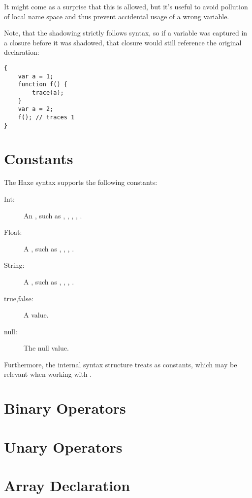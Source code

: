 It might come as a surprise that this is allowed, but it's useful to avoid pollution of local name space and thus prevent accidental usage of a wrong variable.

Note, that the shadowing strictly follows syntax, so if a variable was captured
in a closure before it was shadowed, that closure would still reference the
original declaration:

\begin{lstlisting}
{
	var a = 1;
	function f() {
	    trace(a);
	}
	var a = 2;
	f(); // traces 1
}
\end{lstlisting}


\section{Constants}
\label{expression-constants}

The Haxe syntax supports the following constants:

\begin{description}
	\item[Int:] An , such as , , , , .
	\item[Float:] A , such as , , , .
	\item[String:] A , such as , , , .
	\item[true,false:] A  value.
	\item[null:] The null value.
\end{description}

Furthermore, the internal syntax structure treats  as constants, which may be relevant when working with .


\section{Binary Operators}
\label{expression-binops}

\section{Unary Operators}
\label{expression-unops}

\section{Array Declaration}
\label{expression-array-declaration}

